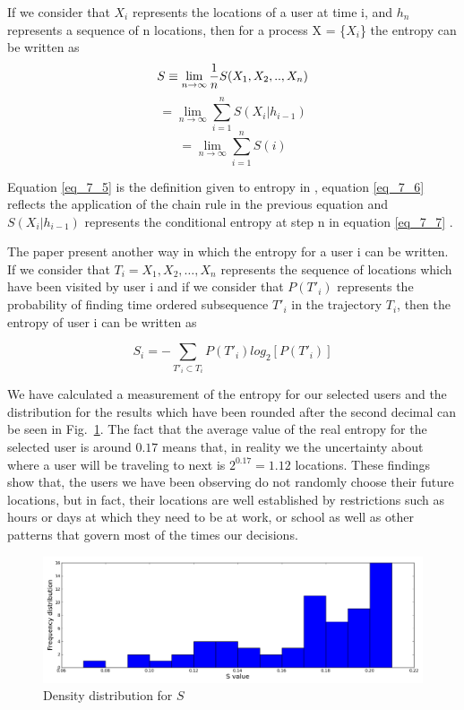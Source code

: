 If we consider that $X_{i}$ represents the locations of a user at time i,
and $h_{n}$ represents a sequence of n locations, then for a process X =
\{$X_{i}$\} the entropy can be written as
\begin{equation}
\label{eq_7_5}
S \equiv \lim_{n\to\infty} {1 \over n}S(X_{1},X_{2},..,X_{n})
\end{equation} 
\begin{equation}
\label{eq_7_6}
= \lim_{n\to\infty} \sum\limits_{i=1}^{n} S(X_{i}|h_{i-1})
\end{equation}
\begin{equation}
\label{eq_7_7}
= \lim_{n\to\infty} \sum\limits_{i=1}^{n} S(i)
\end{equation}

Equation \ref{eq_7_5} is the definition given to entropy in
\cite{Cover:2006:EIT:1146355}, equation \ref{eq_7_6} reflects the application of
the chain rule in the previous equation and $S(X_{i}|h_{i-1})$ represents the
conditional entropy at step n in equation \ref{eq_7_7} \cite{song2010limits}.

The paper \cite{Barabasi10} present another way in which the entropy for a user
i can be written. If we consider that $T_{i} = {X_{1}, X_{2},\ldots, X_{n}}$
represents the sequence of locations which have been visited by user i and if we
consider that $P(T'_{i})$ represents the probability of finding time ordered
subsequence $T'_{i}$ in the trajectory $T_{i}$, then the entropy of user i can
be written as

\begin{equation}
S_{i} = - \sum\limits_{T'_{i}\subset T_{i}}P(T'_{i})log_{2}[P(T'_{i})]
\end{equation}

We have calculated a measurement of the entropy for our selected users and the
distribution for the results which have been rounded after the second decimal
can be seen in Fig.~\ref{dis_full_e}. The fact that the average value of the
real entropy for the selected user is around $0.17$ means that, in reality we
the uncertainty about where a user will be traveling to next is $2^{0.17} =
1.12$ locations. These findings show that, the users we have been observing do
not randomly choose their future locations, but in fact, their locations are
well established by restrictions such as hours or days at which they need to be
at work, or school as well as other patterns that govern most of the times our
decisions.

\begin{figure}[!h]
\centering
\includegraphics[width=\textwidth]{figures/entro_pred/full_entro_distrib.png}
\caption{Density distribution for $S$}
\label{dis_full_e}
\end{figure}

